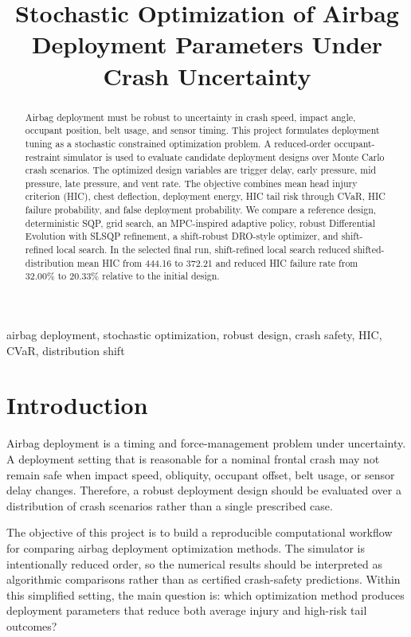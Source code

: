 \documentclass[conference]{IEEEtran}
\title{Stochastic Optimization of Airbag Deployment Parameters Under Crash Uncertainty}
\author{
\IEEEauthorblockN{Jaladhi Joshi (22B0994) and Manav Agrawal (22B1253)}
\IEEEauthorblockA{ME 701 Course Project}
}
\begin{document}
\maketitle

\begin{abstract}
Airbag deployment must be robust to uncertainty in crash speed, impact angle, occupant position, belt usage, and sensor timing. This project formulates deployment tuning as a stochastic constrained optimization problem. A reduced-order occupant-restraint simulator is used to evaluate candidate deployment designs over Monte Carlo crash scenarios. The optimized design variables are trigger delay, early pressure, mid pressure, late pressure, and vent rate. The objective combines mean head injury criterion (HIC), chest deflection, deployment energy, HIC tail risk through CVaR, HIC failure probability, and false deployment probability. We compare a reference design, deterministic SQP, grid search, an MPC-inspired adaptive policy, robust Differential Evolution with SLSQP refinement, a shift-robust DRO-style optimizer, and shift-refined local search. In the selected final run, shift-refined local search reduced shifted-distribution mean HIC from 444.16 to 372.21 and reduced HIC failure rate from 32.00\% to 20.33\% relative to the initial design.
\end{abstract}

\begin{IEEEkeywords}
airbag deployment, stochastic optimization, robust design, crash safety, HIC, CVaR, distribution shift
\end{IEEEkeywords}

\section{Introduction}
Airbag deployment is a timing and force-management problem under uncertainty. A deployment setting that is reasonable for a nominal frontal crash may not remain safe when impact speed, obliquity, occupant offset, belt usage, or sensor delay changes. Therefore, a robust deployment design should be evaluated over a distribution of crash scenarios rather than a single prescribed case.

The objective of this project is to build a reproducible computational workflow for comparing airbag deployment optimization methods. The simulator is intentionally reduced order, so the numerical results should be interpreted as algorithmic comparisons rather than as certified crash-safety predictions. Within this simplified setting, the main question is: which optimization method produces deployment parameters that reduce both average injury and high-risk tail outcomes?
\end{document}
